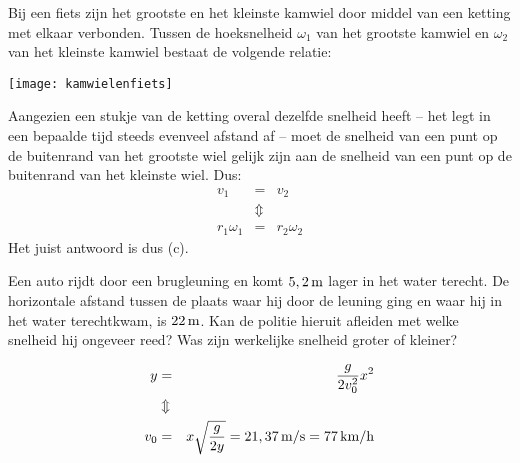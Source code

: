\documentclass{ximera}
\begin{document}
\begin{exercise}
	Bij een fiets zijn het grootste en het kleinste kamwiel door middel van een ketting met elkaar verbonden. Tussen de hoeksnelheid $\omega_1$ van het grootste kamwiel en $\omega_2$ van het kleinste kamwiel bestaat de volgende relatie:
	\newline

\begin{minipage}[t]{0.4\textwidth}
	\begin{multipleChoice}
	\end{multipleChoice}
\end{minipage}
\hfill
\begin{minipage}{0.5\textwidth}
		\begin{image}
			\texttt{[image: kamwielenfiets]}
		\end{image}
	\end{minipage}
\begin{oplossing}
	Aangezien een stukje van de ketting overal dezelfde snelheid heeft -- het legt in een bepaalde tijd steeds evenveel afstand af -- moet de snelheid van een punt op de buitenrand van het grootste wiel gelijk zijn aan de snelheid van een punt op de buitenrand van het kleinste wiel. Dus:
	\begin{eqnarray*}
		v_1&=&v_2\\
		&\Updownarrow&\\
		r_1\omega_1&=&r_2\omega_2
	\end{eqnarray*}
	Het juist antwoord is dus (c).
\end{oplossing}
\end{exercise}

\begin{exercise}
	Een auto rijdt door een brugleuning en komt $5,2\rm\,m$ lager in het water terecht. De horizontale afstand tussen de plaats waar hij door de leuning ging en waar hij in het water terechtkwam, is $22\rm\,m$. Kan de politie hieruit afleiden met welke snelheid hij ongeveer reed? Was zijn werkelijke snelheid groter of kleiner?
\begin{oplossing}
\begin{eqnarray*}
y&=&\frac{g}{2v_0^2}x^2\\
&\Updownarrow&\\
v_0&=&x\sqrt{\frac{g}{2y}}=21,37\rm\,m/s=77\rm\,km/h
\end{eqnarray*}
\end{oplossing}



\end{exercise}
\end{document}
